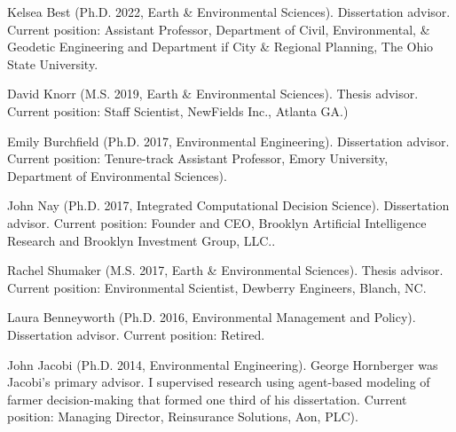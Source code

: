 \item Kelsea Best (Ph.D. 2022, Earth \& Environmental Sciences). 
  Dissertation advisor.
  Current position: Assistant Professor, Department of Civil, Environmental, \& Geodetic
  Engineering and Department if City \& Regional Planning, 
  The Ohio State University.
\item David Knorr (M.S. 2019, Earth \& Environmental Sciences).
  Thesis advisor. 
  Current position: Staff Scientist, NewFields Inc., Atlanta GA.)
\item Emily Burchfield (Ph.D. 2017, Environmental Engineering).
  Dissertation advisor. 
  Current position: Tenure-track Assistant Professor, Emory University, Department of Environmental Sciences).
\item John Nay (Ph.D. 2017, Integrated Computational Decision Science).
  Dissertation advisor. 
  Current position: Founder and CEO, Brooklyn Artificial Intelligence Research and Brooklyn Investment Group, LLC..
\item Rachel Shumaker (M.S. 2017, Earth \& Environmental Sciences).
  Thesis advisor. 
  Current position: Environmental Scientist, Dewberry Engineers, Blanch, NC.
\item Laura Benneyworth (Ph.D. 2016, Environmental Management and Policy).
  Dissertation advisor. 
  Current position: Retired.
\item John Jacobi (Ph.D. 2014, Environmental Engineering). 
  George Hornberger was Jacobi's primary advisor. 
  I supervised research using agent-based modeling of farmer decision-making that formed one third of his dissertation.
  Current position: Managing Director, Reinsurance Solutions, Aon, PLC). 
